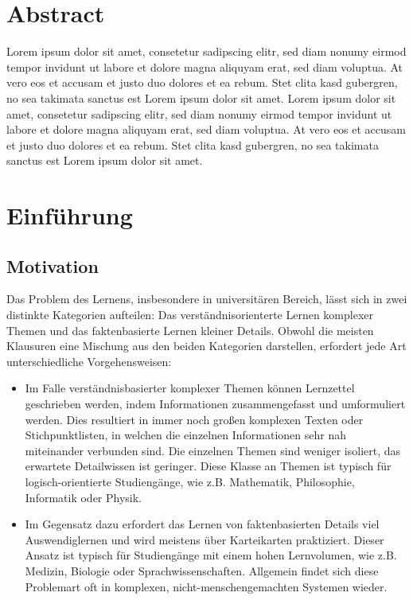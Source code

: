 \documentclass[ngerman]{article}
\begin{document}
\maketitle
\section*{Abstract}
Lorem ipsum dolor sit amet, consetetur sadipscing elitr, sed diam nonumy eirmod tempor invidunt ut labore et dolore magna aliquyam erat, sed diam voluptua. At vero eos et accusam et justo duo dolores et ea rebum. Stet clita kasd gubergren, no sea takimata sanctus est Lorem ipsum dolor sit amet. Lorem ipsum dolor sit amet, consetetur sadipscing elitr, sed diam nonumy eirmod tempor invidunt ut labore et dolore magna aliquyam erat, sed diam voluptua. At vero eos et accusam et justo duo dolores et ea rebum. Stet clita kasd gubergren, no sea takimata sanctus est Lorem ipsum dolor sit amet.
\tableofcontents
\newpage


\section{Einführung}
\subsection{Motivation}
Das Problem des Lernens, insbesondere in universitären Bereich, lässt sich in zwei distinkte Kategorien aufteilen: Das verständnisorienterte Lernen komplexer Themen und das faktenbasierte Lernen kleiner Details. Obwohl die meisten Klausuren eine Mischung aus den beiden Kategorien darstellen, erfordert jede Art unterschiedliche Vorgehensweisen:

\begin{itemize}
\item Im Falle verständnisbasierter komplexer Themen können Lernzettel geschrieben werden, indem Informationen zusammengefasst und umformuliert werden. Dies resultiert in immer noch großen komplexen Texten oder Stichpunktlisten, in welchen die einzelnen Informationen sehr nah miteinander verbunden sind. Die einzelnen Themen sind weniger isoliert, das erwartete Detailwissen ist geringer. Diese Klasse an Themen ist typisch für logisch-orientierte Studiengänge, wie z.B. Mathematik, Philosophie, Informatik oder Physik.
\item Im Gegensatz dazu erfordert das Lernen von faktenbasierten Details viel Auswendiglernen und wird meistens über Karteikarten praktiziert. Dieser Ansatz ist typisch für Studiengänge mit einem hohen Lernvolumen, wie z.B. Medizin, Biologie oder Sprachwissenschaften. Allgemein findet sich diese Problemart oft in komplexen, nicht-menschengemachten Systemen wieder.
\end{itemize}
\end{document}
